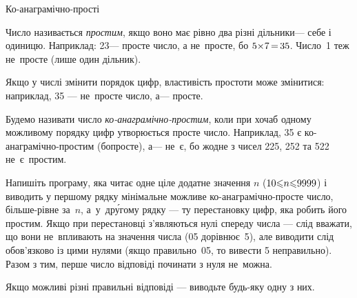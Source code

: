 \begin{problemAllDefault}{Ко-анаграмічно-прості}

Число називається \emph{простим}, якщо воно має рівно два різні дільники\nolinebreak[3] --- себе і одиницю. Наприклад: 23\nolinebreak[3] --- просте число, а не~просте, бо $5{\*}7\dib{{=}}35$. Число~1 теж не~просте (лише один дільник).

Якщо у числі змінити порядок цифр, властивість простоти може змінитися: наприклад, 35 --- не~просте число, а\nolinebreak[3] --- просте.

Будемо називати число \emph{ко-анаграмічно-простим}, коли при хоча\nolinebreak[3] б одному можливому порядку цифр утворюється просте число. Наприклад, 35 є ко-анаграмічно-простим (бо\nolinebreak[3] просте), а\nolinebreak[3] --- не~є, бо жодне з чисел 225, 252 та 522 не~є~простим.

Напишіть програму, яка читає одне ціле додатне значення $n$ ($10{\leqslant}n{\leqslant}9999$) і виводить у першому рядку мінімальне можливе ко-анаграмічно-просте число, більше-рівне за~$n$, а~у~др\'{у}гому рядку --- ту перестановку цифр, яка робить його простим. Якщо при перестановці з’являються нулі спереду числа --- слід вважати, що вони не~впливають на значення числа (05 дорівнює~5), але виводити слід обов’язково із цими нулями (якщо правильно~05, то вивести 5 неправильно). Разом з тим, перше число відповіді починати з нуля не~можна.

Якщо можливі різні правильні відповіді --- виводьте будь-яку одну з них.

\Examples
\begin{exampleSimple}{4em}{4em}%
%
%
%
\end{exampleSimple}

\end{problemAllDefault}

